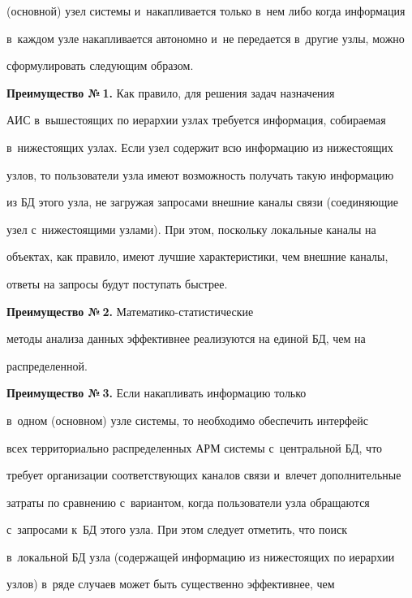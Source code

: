 (основной) узел системы и~накапливается только в~нем либо когда информация 


в~каждом узле накапливается автономно и~не передается в~другие узлы, можно 


сформулировать следующим образом.


  


  \textbf{Преимущество №\,1.} Как правило, для решения задач назначения 


АИС в~вышестоящих по иерархии узлах требуется информация, собираемая 


в~нижестоящих узлах. Если узел содержит всю информацию из нижестоящих 


узлов, то пользователи узла имеют возможность получать такую информацию 


из БД этого узла, не загружая запросами внеш\-ние каналы связи (соединяющие 


узел с~нижестоящими узлами). При этом, поскольку локальные каналы на 


объектах, как правило, имеют лучшие характеристики, чем внешние каналы, 


ответы на запросы будут поступать быстрее. 


  


  \textbf{Преимущество №\,2.} Ма\-те\-ма\-ти\-ко-ста\-ти\-сти\-че\-ские 


методы анализа данных эффективнее реализуются на единой БД, чем на 


распределенной.


  


  \textbf{Преимущество №\,3.} Если накапливать информацию только 


в~одном (основном) узле сис\-те\-мы, то необходимо обеспечить интерфейс 


всех территориально распределенных АРМ системы с~центральной БД, что 


требует организации соответствующих каналов связи и~влечет дополнительные 


затраты по сравнению с~вариантом, когда пользователи узла обращаются 


с~запросами к~БД этого узла. При этом следует отметить, что поиск 


в~локальной БД узла (содержащей информацию из нижестоящих по иерархии 


узлов) в~ряде случаев может быть существенно эффективнее, чем 


